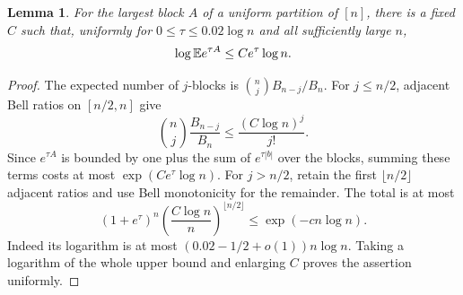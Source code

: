 \documentclass[11pt,letterpaper]{article}
\newtheorem{lemma}[theorem]{Lemma}\newtheorem{proposition}[theorem]{Proposition}\newtheorem{corollary}[theorem]{Corollary}
\theoremstyle{remark}\newtheorem{remark}[theorem]{Remark}
\theoremstyle{definition}\newtheorem{definition}[theorem]{Definition}
\begin{document}
\begin{lemma}\label{sgm:co:lem:growingtilt}
For the largest block $A$ of a uniform partition of $[n]$, there is a fixed $C$ such that, uniformly for $0\le\tau\le0.02\log n$ and all sufficiently large $n$,
\begin{equation}\label{sgm:co:eq:growingtilt}
 \log\mathbb E e^{\tau A}\le Ce^\tau\log n.
\end{equation}
\end{lemma}
\begin{proof}
The expected number of $j$-blocks is $\binom njB_{n-j}/B_n$. For $j\le n/2$, adjacent Bell ratios on $[n/2,n]$ give
\[
 \binom nj\frac{B_{n-j}}{B_n}\le\frac{(C\log n)^j}{j!}.
\]
Since $e^{\tau A}$ is bounded by one plus the sum of $e^{\tau|b|}$ over the blocks, summing these terms costs at most $\exp(Ce^\tau\log n)$. For $j>n/2$, retain the first $\lfloor n/2\rfloor$ adjacent ratios and use Bell monotonicity for the remainder. The total is at most
\[
 (1+e^\tau)^n\left(\frac{C\log n}{n}\right)^{\lfloor n/2\rfloor}
 \le\exp(-c n\log n).
\]
Indeed its logarithm is at most $(0.02-1/2+o(1))n\log n$. Taking a logarithm of the whole upper bound and enlarging $C$ proves the assertion uniformly.
\end{proof}
\end{document}
